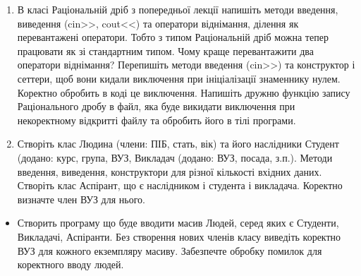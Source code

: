 \documentclass[]{article}
\begin{document}
\begin{enumerate}
\def\labelenumi{\arabic{enumi}.}
\item
  В класі Раціональній дріб з попередньої лекції напишіть методи
  введення, виведення (cin\textgreater{}\textgreater{},
  cout\textless{}\textless{}) та оператори віднімання, ділення як
  перевантажені оператори. Тобто з типом Раціональній дріб можна тепер
  працювати як зі стандартним типом. Чому краще перевантажити два
  оператори віднімання? Перепишіть методи введення
  (cin\textgreater{}\textgreater{}) та конструктор і сеттери, щоб вони
  кидали виключення при ініціалізації знаменнику нулем. Коректно
  обробить в коді це виключення. Напишіть дружню функцію запису
  Раціонального дробу в файл, яка буде викидати виключення при
  некоректному відкритті файлу та обробить його в тілі програми.
\item
  Створіть клас Людина (члени: ПІБ, стать, вік) та його наслідники
  Студент (додано: курс, група, ВУЗ, Викладач (додано: ВУЗ, посада,
  з.п.). Методи введення, виведення, конструктори для різної кількості
  вхідних даних. Створіть клас Аспірант, що є наслідником і студента і
  викладача. Коректно визначте член ВУЗ для нього.
\end{enumerate}

\begin{itemize}
\item
  Створить програму що буде вводити масив Людей, серед яких є Студенти,
  Викладачі, Аспіранти. Без створення нових членів класу виведіть
  коректно ВУЗ для кожного екземпляру масиву. Забезпечте обробку помилок
  для коректного вводу людей.
\end{itemize}
\end{document}
